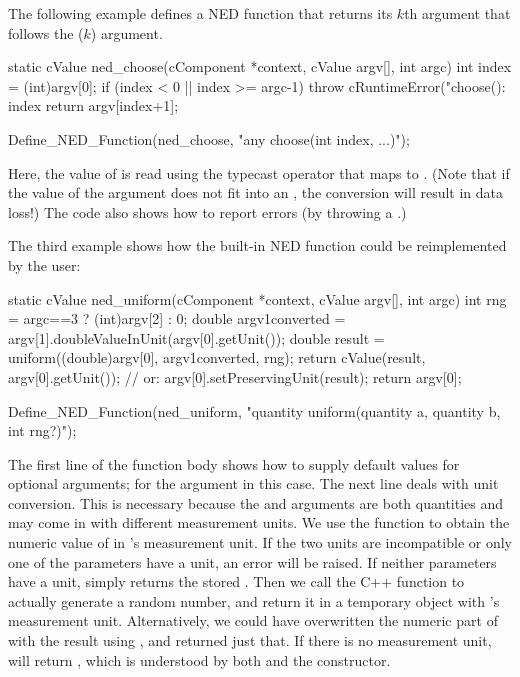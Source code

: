 The following example defines a  NED function that returns
its $k$th argument that follows the  ($k$) argument.

\begin{cpp}
static cValue ned_choose(cComponent *context, cValue argv[], int argc)
{
    int index = (int)argv[0];
    if (index < 0 || index >= argc-1)
        throw cRuntimeError("choose(): index %
    return argv[index+1];
}

Define_NED_Function(ned_choose, "any choose(int index, ...)");
\end{cpp}

Here, the value of  is read using the typecast operator that
maps to . (Note that if the value of the 
argument does not fit into an , the conversion will result
in data loss!) The code also shows how to report errors (by throwing a
.)

The third example shows how the built-in  NED function could
be reimplemented by the user:

\begin{cpp}
static cValue ned_uniform(cComponent *context, cValue argv[], int argc)
{
    int rng = argc==3 ? (int)argv[2] : 0;
    double argv1converted = argv[1].doubleValueInUnit(argv[0].getUnit());
    double result = uniform((double)argv[0], argv1converted, rng);
    return cValue(result, argv[0].getUnit());
    // or: argv[0].setPreservingUnit(result); return argv[0];
}

Define_NED_Function(ned_uniform, "quantity uniform(quantity a, quantity b, int rng?)");
\end{cpp}

The first line of the function body shows how to supply default values for
optional arguments; for the  argument in this case. The next line
deals with unit conversion. This is necessary because the  and
 arguments are both quantities and may come in with different
measurement units. We use the  function to
obtain the numeric value of  in 's measurement unit. If the
two units are incompatible or only one of the parameters have a unit, an
error will be raised. If neither parameters have a unit,
 simply returns the stored . Then we
call the  C++ function to actually generate a random number,
and return it in a temporary object with 's measurement unit.
Alternatively, we could have overwritten the numeric part of  with
the result using , and returned just that. If
there is no measurement unit,  will return ,
which is understood by both  and the
 constructor.

